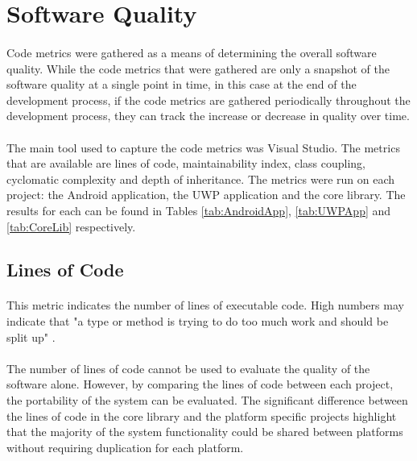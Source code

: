 \section{Software Quality}{
	\label{sec:Quality}
	\paragraph{}{
	Code metrics were gathered as a means of determining the overall software quality. While the code metrics that were gathered are only a snapshot of the software quality at a single point in time, in this case at the end of the development process, if the code metrics are gathered periodically throughout the development process, they can track the increase or decrease in quality over time.
	}
	\paragraph{}{
	The main tool used to capture the code metrics was Visual Studio. The metrics that are available are lines of code, maintainability index, class coupling, cyclomatic complexity and depth of inheritance. The metrics were run on each project: the Android application, the UWP application and the core library. The results for each can be found in Tables \ref{tab:AndroidApp}, \ref{tab:UWPApp} and \ref{tab:CoreLib} respectively.
	}
	
	\subsection*{Lines of Code}
		\paragraph{}{
		This metric indicates the number of lines of executable code. High numbers may indicate that "a type or method is trying to do too much work and should be split up" \cite{CodeMetrics}.
		}
		\paragraph{}{
		The number of lines of code cannot be used to evaluate the quality of the software alone. However,  by comparing the lines of code between each project, the portability of the system can be evaluated. The significant difference between the lines of code in the core library and the platform specific projects highlight that the majority of the system functionality could be shared between platforms without requiring duplication for each platform.
		}
		
}
